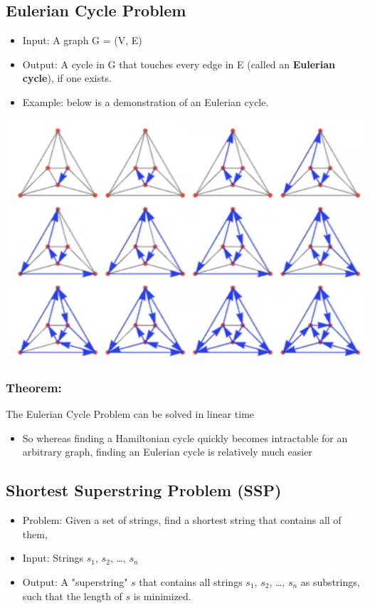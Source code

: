 \documentclass[10pt]{article}
\begin{document}
\subsection*{Eulerian Cycle Problem}
\begin{itemize}
    \item Input: A graph G = (V, E)
    \item Output: A cycle in G that touches every edge in E (called an \textbf{Eulerian cycle}), if one exists.
    \item Example: below is a demonstration of an Eulerian cycle.
\end{itemize}
\begin{center}
    \includegraphics*[scale=0.8]{W4_4.png}
\end{center}

\subsubsection*{Theorem:}
The Eulerian Cycle Problem can be solved in linear time
\begin{itemize}
    \item So whereas finding a Hamiltonian cycle quickly becomes intractable for an arbitrary graph, finding an Eulerian cycle is relatively much easier
\end{itemize}

\subsection*{Shortest Superstring Problem (SSP)}
\begin{itemize}
    \item Problem: Given a set of strings, find a shortest string that contains all of them,
    \item Input: Strings $s_1$, $s_2$, \dots, $s_n$
    \item Output: A "superstring" $s$ that contains all strings $s_1$, $s_2$, \dots, $s_n$ as substrings, such that the length of $s$ is minimized.
\end{itemize}
\end{document}
